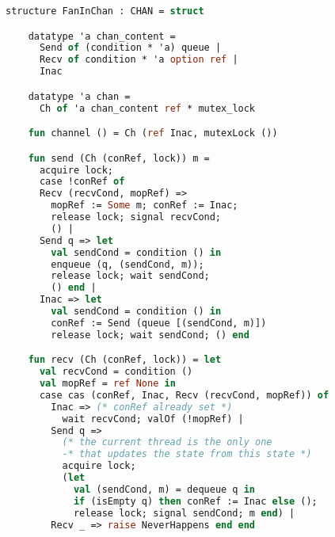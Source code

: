\documentclass{article}
\begin{document}
  \begin{lstlisting}[language=ML, style=codestyle1]
    structure FanInChan : CHAN = struct

    datatype 'a chan_content =
      Send of (condition * 'a) queue |
      Recv of condition * 'a option ref |
      Inac

    datatype 'a chan =
      Ch of 'a chan_content ref * mutex_lock

    fun channel () = Ch (ref Inac, mutexLock ())

    fun send (Ch (conRef, lock)) m = 
      acquire lock;
      case !conRef of
      Recv (recvCond, mopRef) => 
        mopRef := Some m; conRef := Inac;
        release lock; signal recvCond;
        () |
      Send q => let
        val sendCond = condition () in
        enqueue (q, (sendCond, m));
        release lock; wait sendCond;
        () end |
      Inac => let
        val sendCond = condition () in
        conRef := Send (queue [(sendCond, m)])
        release lock; wait sendCond; () end 

    fun recv (Ch (conRef, lock)) = let
      val recvCond = condition () 
      val mopRef = ref None in
      case cas (conRef, Inac, Recv (recvCond, mopRef)) of
        Inac => (* conRef already set *)
          wait recvCond; valOf (!mopRef) |
        Send q =>
          (* the current thread is the only one
          -* that updates the state from this state *)
          acquire lock;
          (let
            val (sendCond, m) = dequeue q in
            if (isEmpty q) then conRef := Inac else (); 
            release lock; signal sendCond; m end) |
        Recv _ => raise NeverHappens end end

    \end{lstlisting}
\end{document}
